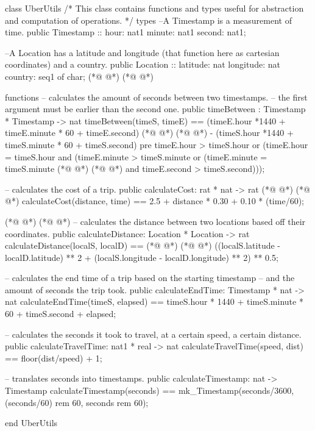 \begin{vdmpp}[breaklines=true]
class UberUtils
/*
    This class contains functions and types useful for abstraction and computation of operations.
*/
types
    --A Timestamp is a measurement of time.
    public Timestamp :: hour: nat1
                        minute: nat1
                        second: nat1;
    
    --A Location has a latitude and longitude (that function here as cartesian coordinates) and a country.
    public Location :: latitude: nat
                       longitude: nat
                       country: seq1 of char;
(*@
\label{timeBetween:15}
@*)
(*@
\label{timeBetween:15}
@*)

functions
    -- calculates the amount of seconds between two timestamps.
    -- the first argument must be earlier than the second one.
    public timeBetween : Timestamp * Timestamp -> nat
        timeBetween(timeS, timeE) == 
            (timeE.hour *1440 + timeE.minute * 60 + timeE.second) 
(*@
\label{calculateCost:22}
@*)
(*@
\label{calculateCost:22}
@*)
                    - (timeS.hour *1440 + timeS.minute * 60 + timeS.second)
        pre timeE.hour > timeS.hour or (timeE.hour = timeS.hour and 
                    (timeE.minute > timeS.minute or (timeE.minute = timeS.minute 
(*@
\label{calculateDistance:25}
@*)
(*@
\label{calculateDistance:25}
@*)
                    and timeE.second > timeS.second)));
    
    -- calculates the cost of a trip.
    public calculateCost: rat * nat -> rat
(*@
\label{calculateEndTime:29}
@*)
(*@
\label{calculateEndTime:29}
@*)
        calculateCost(distance, time) == 
            2.5 + distance * 0.30 + 0.10 * (time/60);
    
(*@
\label{calculateTravelTime:32}
@*)
(*@
\label{calculateTravelTime:32}
@*)
    -- calculates the distance between two locations based off their coordinates.
    public calculateDistance: Location * Location -> rat    
        calculateDistance(localS, localD) ==
(*@
\label{calculateTimestamp:35}
@*)
(*@
\label{calculateTimestamp:35}
@*)
            ((localS.latitude - localD.latitude) ** 2 + (localS.longitude - localD.longitude) ** 2) ** 0.5;
    
    -- calculates the end time of a trip based on the starting timestamp 
    -- and the amount of seconds the trip took.        
    public calculateEndTime: Timestamp * nat -> nat
        calculateEndTime(timeS, elapsed) == 
            timeS.hour * 1440 + timeS.minute * 60 + timeS.second + elapsed;
    
    -- calculates the seconds it took to travel, at a certain speed, a certain distance.
    public calculateTravelTime: nat1 * real -> nat
        calculateTravelTime(speed, dist) == 
            floor(dist/speed) + 1;
    
    -- translates seconds into timestamps.            
    public calculateTimestamp: nat -> Timestamp
        calculateTimestamp(seconds) == 
            mk_Timestamp(seconds/3600, (seconds/60) rem 60, seconds rem 60);
        
end UberUtils
\end{vdmpp}
